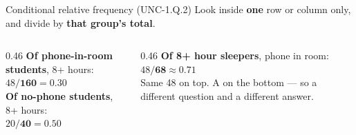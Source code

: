 \documentclass[aspectratio=169, 11pt]{beamer}
\begin{document}
\begin{frame}[t, plain]
  \vspace{4pt}
  \begin{block}{Conditional relative frequency (UNC-1.Q.2)}
    Look inside \textbf{one} row or column only, and divide by \textbf{that group's total}.
  \end{block}
  \vspace{8pt}
  \begin{columns}[t]
    \begin{column}{0.46\textwidth}
      \textbf{Of phone-in-room students}, 8+ hours: \\[3pt]
      \hspace{1em}$48 / \mathbf{160} = 0.30$ \\[8pt]
      \textbf{Of no-phone students}, 8+ hours: \\[3pt]
      \hspace{1em}$20 / \mathbf{40} = 0.50$
    \end{column}
    \begin{column}{0.46\textwidth}
      \textbf{Of 8+ hour sleepers}, phone in room: \\[3pt]
      \hspace{1em}$48 / \mathbf{68} \approx 0.71$ \\[8pt]
      {\small\color{slate} Same 48 on top. A  on the bottom --- so a
      different question and a different answer.}
    \end{column}
  \end{columns}
\end{frame}
\end{document}

